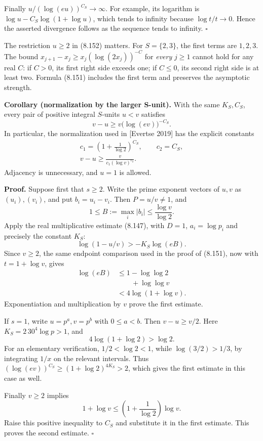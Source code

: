\documentclass[
  11pt,
  a4paper,
]{article}
\begin{document}
Finally \(u/(\log(eu))^{C_S}\to\infty\). For example, its logarithm is
\(\log u-C_S\log(1+\log u)\), which tends to infinity because
\(\log t/t\to0\). Hence the asserted divergence follows as the sequence
tends to infinity. \(\square\)

The restriction \(u\ge2\) in (8.152) matters. For \(S=\{2,3\}\), the
first terms are \(1,2,3\). The bound
\(x_{j+1}-x_j\ge x_j(\log(2x_j))^{-C}\) for \emph{every} \(j\ge1\)
cannot hold for any real \(C\): if \(C>0\), its first right side exceeds
one; if \(C\le0\), its second right side is at least two. Formula
(8.151) includes the first term and preserves the asymptotic strength.

\textbf{Corollary (normalization by the larger S-unit).} With the same
\(K_S,C_S\), every pair of positive integral \(S\)-units \(u<v\)
satisfies \[
v-u\ge v\bigl(\log(ev)\bigr)^{-C_S}.
\] In particular, the normalization used in {[}Evertse 2019{]} has the
explicit constants \[
\begin{gathered}
c_1=\left(1+\frac1{\log2}\right)^{C_S},\qquad c_2=C_S,\\
v-u\ge\frac{v}{c_1(\log v)^{c_2}}.
\end{gathered}
\] Adjacency is unnecessary, and \(u=1\) is allowed.

\textbf{Proof.} Suppose first that \(s\ge2\). Write the prime exponent
vectors of \(u,v\) as \((u_i),(v_i)\), and put \(b_i=u_i-v_i\). Then
\(P=u/v\ne1\), and \[
1\le B:=\max_i|b_i|\le\frac{\log v}{\log2}.
\] Apply the real multiplicative estimate (8.147), with \(D=1\),
\(a_i=\log p_i\) and precisely the constant \(K_S\): \[
\log(1-u/v)>-K_S\log(eB).
\] Since \(v\ge2\), the same endpoint comparison used in the proof of
(8.151), now with \(t=1+\log v\), gives \[
\begin{aligned}
\log(eB)&\le1-\log\log2\\
&\qquad+\log\log v\\
&<4\log(1+\log v).
\end{aligned}
\] Exponentiation and multiplication by \(v\) prove the first estimate.

If \(s=1\), write \(u=p^a,v=p^b\) with \(0\le a<b\). Then
\(v-u\ge v/2\). Here \(K_S=2\,30^4\log p>1\), and \[
4\log(1+\log2)>\log2.
\] For an elementary verification, \(1/2<\log2<1\), while
\(\log(3/2)>1/3\), by integrating \(1/x\) on the relevant intervals.
Thus \((\log(ev))^{C_S}\ge(1+\log2)^{4K_S}>2\), which gives the first
estimate in this case as well.

Finally \(v\ge2\) implies \[
1+\log v\le\left(1+\frac1{\log2}\right)\log v.
\] Raise this positive inequality to \(C_S\) and substitute it in the
first estimate. This proves the second estimate. \(\square\)
\end{document}
